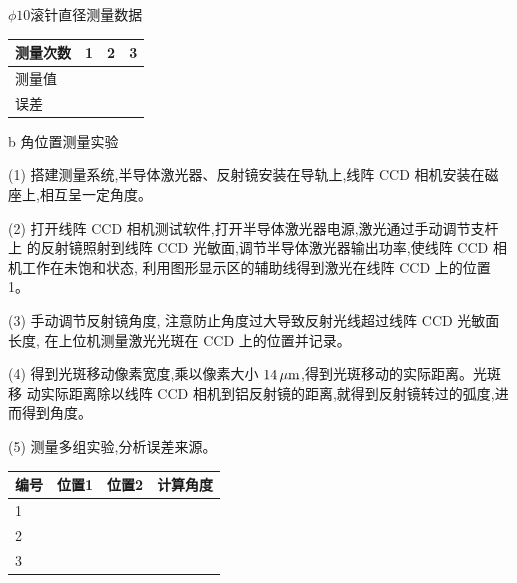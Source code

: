 \documentclass{ctexart}
\begin{document}
$\phi 10$滚针直径测量数据

\begin{tabular}{|p{5em}|p{5em}|p{5em}|p{5em}|}
	\hline 
        测量次数 & 1& 2&3     \\
	\hline
	测量值 & & &  \\
	\hline
	误差 & & &  \\
	\hline	
\end{tabular}

b 角位置测量实验

(1) 搭建测量系统,半导体激光器、反射镜安装在导轨上,线阵 CCD 相机安装在磁座上,相互呈一定角度。

(2) 打开线阵 CCD 相机测试软件,打开半导体激光器电源,激光通过手动调节支杆上
的反射镜照射到线阵 CCD 光敏面,调节半导体激光器输出功率,使线阵 CCD 相
机工作在未饱和状态,
利用图形显示区的辅助线得到激光在线阵 CCD 上的位置 1。

(3) 手动调节反射镜角度,
注意防止角度过大导致反射光线超过线阵 CCD 光敏面长度,
在上位机测量激光光斑在 CCD 上的位置并记录。

(4) 得到光斑移动像素宽度,乘以像素大小 $14\,\mathrm{\mu m}$,得到光斑移动的实际距离。光斑移
动实际距离除以线阵 CCD 相机到铝反射镜的距离,就得到反射镜转过的弧度,进而得到角度。

(5) 测量多组实验,分析误差来源。

\begin{tabular}{|p{5em}|p{5em}|p{5em}|p{5em}|}
	\hline 
        编号 & 位置1& 位置2&计算角度     \\
	\hline
	1& & &  \\
	\hline
	2 & & &  \\
	\hline
	3 & & &  \\
	\hline
\end{tabular}
\end{document}
